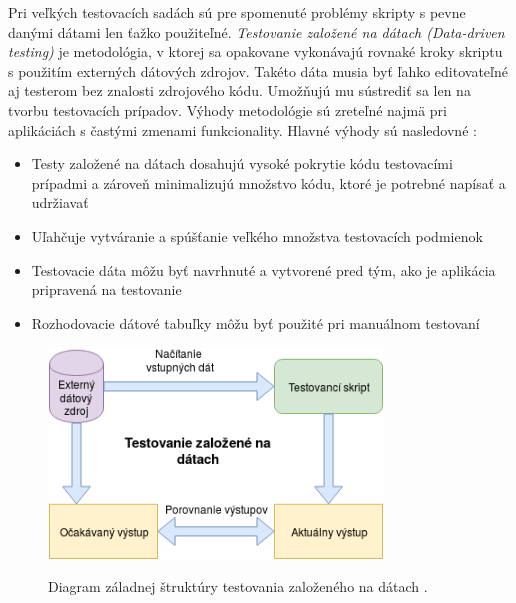 Pri veľkých testovacích sadách sú pre spomenuté problémy skripty s pevne danými dátami len ťažko použiteľné. {\it Testovanie založené na dátach (Data-driven testing)} je metodológia, v ktorej sa opakovane vykonávajú rovnaké kroky skriptu s použitím externých dátových zdrojov. Takéto dáta musia byť ľahko editovateľné aj testerom bez znalosti zdrojového kódu. Umožňujú mu  sústrediť sa len na tvorbu testovacích prípadov. Výhody metodológie sú zreteľné najmä pri aplikáciách s častými zmenami funkcionality. Hlavné výhody sú nasledovné \cite{Sttc}:
\begin{itemize}
	\item{Testy založené na dátach dosahujú vysoké pokrytie kódu testovacími prípadmi a zároveň minimalizujú množstvo kódu, ktoré je potrebné napísať a udržiavať}
	\item{Uľahčuje vytváranie a spúšťanie veľkého množstva testovacích podmienok}
	\item{Testovacie dáta môžu byť navrhnuté a vytvorené pred tým, ako je aplikácia pripravená na testovanie}
	\item{Rozhodovacie dátové tabuľky môžu byť použité pri manuálnom testovaní}
\end{itemize}
\begin{figure}[h]\centering
	\centering
	\includegraphics[width=3.5in,height=2.2in]{obrazky-figures/Data-driven_testing.png}\\[1pt]
	\caption{Diagram záladnej štruktúry testovania založeného na dátach .}
	\label{Tdd_img}
\end{figure}
